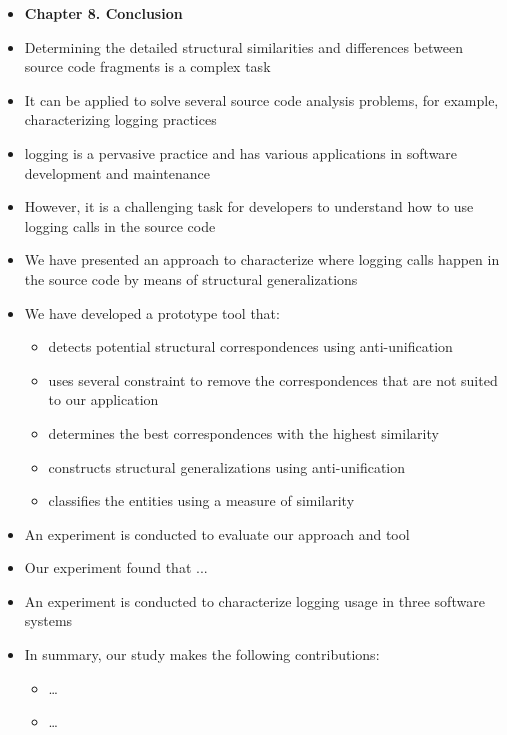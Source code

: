 \documentclass{article}
\newcommand{\bold}{\textbf}
\begin{document}
\begin{itemize} [leftmargin=.1in]
\item \bold{Chapter 8. Conclusion}
\item Determining the detailed structural similarities and differences between source code fragments is a complex task
\item It can be applied to solve several source code analysis problems, for example, characterizing logging practices
\item logging is a pervasive practice and has various applications in software development and maintenance
\item However, it is a challenging task for developers to understand how to use logging calls in the source code 
\item We have presented an approach to characterize where logging calls happen in the source code by means of structural generalizations
\item We have developed a prototype tool that: 
\begin{itemize}
\item detects potential structural correspondences using anti-unification
\item uses several constraint to remove the correspondences that are not suited to our application 
\item determines the best correspondences with the highest similarity
\item constructs structural generalizations using anti-unification
\item classifies the entities using a measure of similarity 
\end{itemize}
\item An experiment is conducted to evaluate our approach and tool
\item Our experiment found that ... 
\item An experiment is conducted to characterize logging usage in three software systems
\item In summary, our study makes the following contributions:
\begin{itemize}
\item …
\item …
\end{itemize}


\end{itemize}
\end{document}
